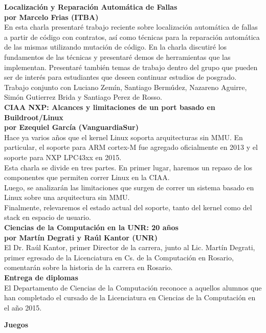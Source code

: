 \documentclass[12pt, a4paper]{article}
\newcommand{\charla}[3]{
	{\large\bf#1}\\
	{\bf por #2}\\
	#3\\
}
\begin{document}
\charla
{Localización y Reparación Automática de Fallas}
{Marcelo Frias (ITBA)}
{En esta charla presentaré trabajo reciente sobre localización automática de fallas a partir de código con contratos, así como técnicas para la reparación automática de las mismas utilizando mutación de código. En la charla discutiré los fundamentos de las técnicas y presentaré demos de herramientas que las implementan. Presentaré también temas de trabajo dentro del grupo que pueden ser de interés para estudiantes que deseen continuar estudios de posgrado. \\
Trabajo conjunto con Luciano Zemín, Santiago Bermúdez, Nazareno Aguirre, Simón Gutierrez Brida y Santiago Perez de Rosso.}

\charla
{CIAA NXP: Alcances y limitaciones de un port basado en Buildroot/Linux}
{Ezequiel García (VanguardiaSur)}
{Hace ya varios años que el kernel Linux soporta arquitecturas sin MMU. En particular, el soporte para ARM cortex-M fue agregado oficialmente en 2013 y el soporte para NXP LPC43xx en 2015. \\
Esta charla se divide en tres partes. En primer lugar, haremos un repaso de los componentes que permiten correr Linux en la CIAA. \\
Luego, se analizarán las limitaciones que surgen de correr un sistema basado en Linux sobre una arquitectura sin MMU. \\
Finalmente, relevaremos el estado actual del soporte, tanto del kernel como del stack en espacio de usuario.}

\charla
{Ciencias de la Computación en la UNR: 20 años}
{Martín Degrati y Raúl Kantor (UNR)}
{El Dr. Raúl Kantor, primer Director de la carrera, junto al Lic. Martín Degrati, primer egresado de la Licenciatura en Cs. de la Computación en Rosario, comentarán sobre la historia de la carrera en Rosario.}

{\large\bf{Entrega de diplomas}}\\
{El Departamento de Ciencias de la Computación reconoce a aquellos alumnos que han completado el cursado de la Licenciatura en Ciencias de la Computación en el año 2015.}

\newpage

\begin{center}\LARGE\bf Juegos\end{center}
\end{document}
